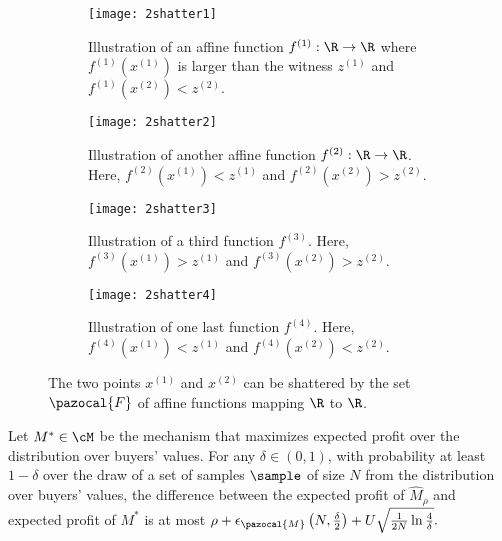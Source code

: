 
\begin{figure}
	\centering
	\begin{subfigure}{0.45\textwidth}
		\texttt{[image: 2shatter1]}\centering
		\caption{Illustration of an affine function $f^{(1)} : \R \to \R$ where $f^{(1)}\left(x^{(1)}\right)$ is larger than the witness $z^{(1)}$ and $f^{(1)}\left(x^{(2)}\right) < z^{(2)}$.}
	\end{subfigure}\qquad
	\begin{subfigure}{0.45\textwidth}
		\texttt{[image: 2shatter2]}\centering
		\caption{Illustration of another affine function $f^{(2)} : \R \to \R$. Here, $f^{(2)}\left(x^{(1)}\right) < z^{(1)}$ and $f^{(2)}\left(x^{(2)}\right) > z^{(2)}$.}
	\end{subfigure}\qquad
	\begin{subfigure}{0.45\textwidth}
		\texttt{[image: 2shatter3]}\centering
		\caption{Illustration of a third function $f^{(3)}$. Here, $f^{(3)}\left(x^{(1)}\right) > z^{(1)}$ and $f^{(3)}\left(x^{(2)}\right) > z^{(2)}$.}
	\end{subfigure}\qquad
	\begin{subfigure}{0.45\textwidth}
		\texttt{[image: 2shatter4]}\centering
		\caption{Illustration of one last function $f^{(4)}$. Here, $f^{(4)}\left(x^{(1)}\right) < z^{(1)}$ and $f^{(4)}\left(x^{(2)}\right) < z^{(2)}$.}
	\end{subfigure}
	\caption{The two points $x^{(1)}$ and $x^{(2)}$ can be shattered by the set $\pazocal{F}$ of affine functions mapping $\R$ to $\R$.}\label{fig:shattering}
\end{figure}


\begin{corollary}\label{cor:add_apx}
	Let $M^* \in \cM$ be the mechanism that maximizes expected profit over the distribution over buyers' values. For any $\delta \in (0,1)$, with probability at least $1-\delta$ over the draw of a set of samples $\sample$ of size $N$ from the distribution over buyers' values, the difference between the expected profit of $\hat{M}_{\rho}$ and expected profit of $M^*$ is at most $\rho + \epsilon_{\pazocal{M}}\left(N, \frac{\delta}{2}\right) + U\sqrt{\frac{1}{2N} \ln \frac{4}{\delta}}.$
\end{corollary}

